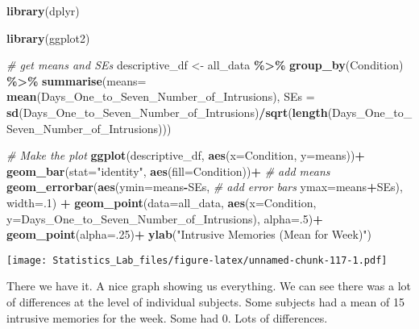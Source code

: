 \documentclass[
]{book}
\newenvironment{Shaded}{\begin{snugshade}}{\end{snugshade}}
\newcommand{\AttributeTok}[1]{\textcolor[rgb]{0.13,0.29,0.53}{#1}}
\newcommand{\CommentTok}[1]{\textcolor[rgb]{0.56,0.35,0.01}{\textit{#1}}}
\newcommand{\DecValTok}[1]{\textcolor[rgb]{0.00,0.00,0.81}{#1}}
\newcommand{\FunctionTok}[1]{\textcolor[rgb]{0.13,0.29,0.53}{\textbf{#1}}}
\newcommand{\NormalTok}[1]{#1}
\newcommand{\OtherTok}[1]{\textcolor[rgb]{0.56,0.35,0.01}{#1}}
\newcommand{\SpecialCharTok}[1]{\textcolor[rgb]{0.81,0.36,0.00}{\textbf{#1}}}
\newcommand{\StringTok}[1]{\textcolor[rgb]{0.31,0.60,0.02}{#1}}
\begin{document}
\begin{Shaded}
\begin{Highlighting}[]
\FunctionTok{library}\NormalTok{(dplyr)}

\FunctionTok{library}\NormalTok{(ggplot2)}

\CommentTok{\# get means and SEs}
\NormalTok{descriptive\_df }\OtherTok{\textless{}{-}}\NormalTok{ all\_data }\SpecialCharTok{\%\textgreater{}\%} 
                    \FunctionTok{group\_by}\NormalTok{(Condition) }\SpecialCharTok{\%\textgreater{}\%} 
                    \FunctionTok{summarise}\NormalTok{(}\AttributeTok{means=} \FunctionTok{mean}\NormalTok{(Days\_One\_to\_Seven\_Number\_of\_Intrusions),}
                              \AttributeTok{SEs =} \FunctionTok{sd}\NormalTok{(Days\_One\_to\_Seven\_Number\_of\_Intrusions)}\SpecialCharTok{/}\FunctionTok{sqrt}\NormalTok{(}\FunctionTok{length}\NormalTok{(Days\_One\_to\_Seven\_Number\_of\_Intrusions)))}

\CommentTok{\# Make the plot}
\FunctionTok{ggplot}\NormalTok{(descriptive\_df, }\FunctionTok{aes}\NormalTok{(}\AttributeTok{x=}\NormalTok{Condition, }\AttributeTok{y=}\NormalTok{means))}\SpecialCharTok{+} 
  \FunctionTok{geom\_bar}\NormalTok{(}\AttributeTok{stat=}\StringTok{"identity"}\NormalTok{, }\FunctionTok{aes}\NormalTok{(}\AttributeTok{fill=}\NormalTok{Condition))}\SpecialCharTok{+} \CommentTok{\# add means}
  \FunctionTok{geom\_errorbar}\NormalTok{(}\FunctionTok{aes}\NormalTok{(}\AttributeTok{ymin=}\NormalTok{means}\SpecialCharTok{{-}}\NormalTok{SEs,               }\CommentTok{\# add error bars}
                    \AttributeTok{ymax=}\NormalTok{means}\SpecialCharTok{+}\NormalTok{SEs), }\AttributeTok{width=}\NormalTok{.}\DecValTok{1}\NormalTok{) }\SpecialCharTok{+}
  \FunctionTok{geom\_point}\NormalTok{(}\AttributeTok{data=}\NormalTok{all\_data, }\FunctionTok{aes}\NormalTok{(}\AttributeTok{x=}\NormalTok{Condition, }\AttributeTok{y=}\NormalTok{Days\_One\_to\_Seven\_Number\_of\_Intrusions), }\AttributeTok{alpha=}\NormalTok{.}\DecValTok{5}\NormalTok{)}\SpecialCharTok{+}
  \FunctionTok{geom\_point}\NormalTok{(}\AttributeTok{alpha=}\NormalTok{.}\DecValTok{25}\NormalTok{)}\SpecialCharTok{+}
  \FunctionTok{ylab}\NormalTok{(}\StringTok{"Intrusive Memories (Mean for Week)"}\NormalTok{)}
\end{Highlighting}
\end{Shaded}

\texttt{[image: Statistics\_Lab\_files/figure-latex/unnamed-chunk-117-1.pdf]}

There we have it. A nice graph showing us everything. We can see there was a lot of differences at the level of individual subjects. Some subjects had a mean of 15 intrusive memories for the week. Some had 0. Lots of differences.
\end{document}
